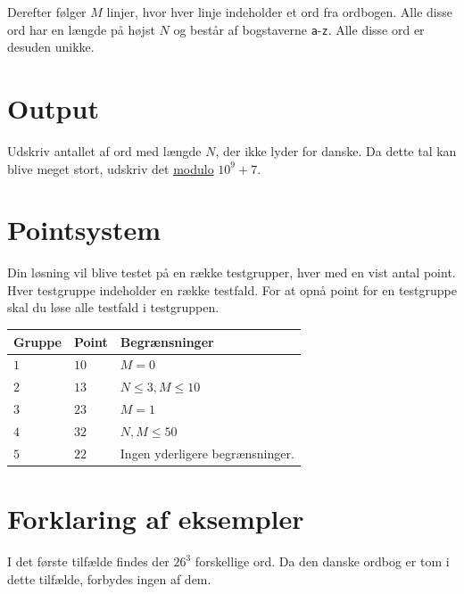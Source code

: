 Derefter følger $M$ linjer, hvor hver linje indeholder et ord fra ordbogen. Alle disse ord har en længde på højst $N$ 
og består af bogstaverne \texttt{a}-\texttt{z}. Alle disse ord er desuden unikke.

\section*{Output}
Udskriv antallet af ord med længde $N$, der ikke lyder for danske. Da dette tal kan blive meget stort, 
udskriv det \href{https://en.wikipedia.org/wiki/Modulo}{modulo} $10^9+7$. 

\section*{Pointsystem}
Din løsning vil blive testet på en række testgrupper, hver med en vist antal point. 
Hver testgruppe indeholder en række testfald. For at opnå point for en testgruppe skal du løse alle
testfald i testgruppen. 

\noindent
\begin{tabular}{| l | l | p{12cm} |}
  \hline
  \textbf{Gruppe} & \textbf{Point} & \textbf{Begrænsninger} \\ \hline
  $1$    & $10$       & $M = 0$ \\ \hline
  $2$    & $13$       & $N \leq 3, M \leq 10$ \\ \hline
  $3$    & $23$       & $M = 1$ \\ \hline
  $4$    & $32$       & $N, M \leq 50$ \\ \hline
  $5$    & $22$       & Ingen yderligere begrænsninger. \\ \hline
\end{tabular}

\section*{Forklaring af eksempler}
I det første tilfælde findes der $26^3$ forskellige ord. Da den danske ordbog er tom i dette tilfælde,
forbydes ingen af dem.
